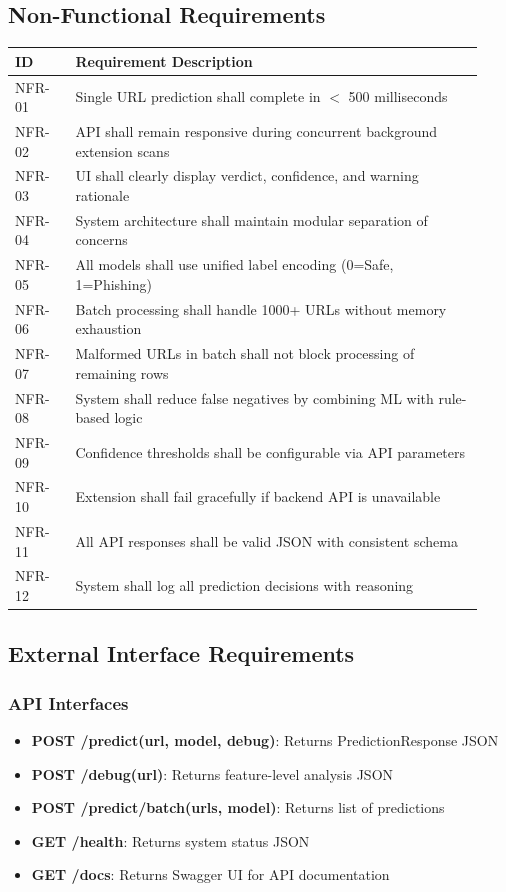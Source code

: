 \documentclass[12pt,a4paper]{report}
\begin{document}
\subsection{Non-Functional Requirements}

\begin{longtable}{p{0.12\linewidth}p{0.81\linewidth}}
\toprule
\textbf{ID} & \textbf{Requirement Description} \\
\midrule
NFR-01 & Single URL prediction shall complete in $<$ 500 milliseconds \\
NFR-02 & API shall remain responsive during concurrent background extension scans \\
NFR-03 & UI shall clearly display verdict, confidence, and warning rationale \\
NFR-04 & System architecture shall maintain modular separation of concerns \\
NFR-05 & All models shall use unified label encoding (0=Safe, 1=Phishing) \\
NFR-06 & Batch processing shall handle 1000+ URLs without memory exhaustion \\
NFR-07 & Malformed URLs in batch shall not block processing of remaining rows \\
NFR-08 & System shall reduce false negatives by combining ML with rule-based logic \\
NFR-09 & Confidence thresholds shall be configurable via API parameters \\
NFR-10 & Extension shall fail gracefully if backend API is unavailable \\
NFR-11 & All API responses shall be valid JSON with consistent schema \\
NFR-12 & System shall log all prediction decisions with reasoning \\
\bottomrule
\end{longtable}

\subsection{External Interface Requirements}

\subsubsection{API Interfaces}
\begin{itemize}[leftmargin=*]
    \item \textbf{POST /predict(url, model, debug)}: Returns PredictionResponse JSON
    \item \textbf{POST /debug(url)}: Returns feature-level analysis JSON
    \item \textbf{POST /predict/batch(urls, model)}: Returns list of predictions
    \item \textbf{GET /health}: Returns system status JSON
    \item \textbf{GET /docs}: Returns Swagger UI for API documentation
\end{itemize}
\end{document}

